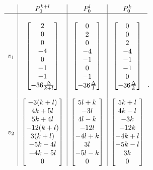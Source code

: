 \documentclass[11pt,letterpaper]{amsart}
\theoremstyle{definition}
\numberwithin{equation}{section}
\begin{document}
$$
\begin{array}{c|c|c|c}
&P_0^{k+l}&P_0^{l}&P_0^{k}\\
\hline
&&&\\
v_1& \begin{bmatrix}
2\\
0\\
0\\
-4\\
0\\
-1\\
-1\\
-36\frac{\Delta}{k+l}
\end{bmatrix}&\begin{bmatrix}
0\\
2\\
0\\
-4\\
-1\\
0\\
-1\\
-36\frac{\Delta}{l}
\end{bmatrix}&\begin{bmatrix}
0\\
0\\
2\\
-4\\
-1\\
-1\\
0\\
-36\frac{\Delta}{k}
\end{bmatrix}\\
&&&\\
v_2& \begin{bmatrix}
-3(k+l)\\
4k+5l\\
5k+4l\\
-12(k+l)\\
3(k+l)\\
-5k-4l\\
-4k-5l\\
0
\end{bmatrix}&\begin{bmatrix}
5l+k\\
-3l\\
4l-k\\
-12l\\
-4l+k\\
3l\\
-5l-k\\
0
\end{bmatrix}&\begin{bmatrix}
5k+l\\
4k-l\\
-3k\\
-12k\\
-4k+l\\
-5k-l\\
3k\\
0
\end{bmatrix}\\[1ex]
\end{array}.
$$
\end{document}
